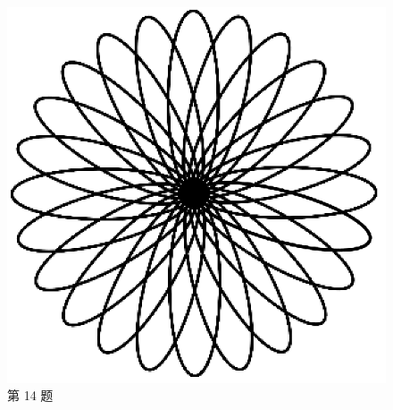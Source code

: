\documentclass[10pt, a4paper]{article}
\begin{document}
\begin{enumerate}
\begin{figure}[htbp]
\begin{minipage}[t]{.33\textwidth}
                \begin{minipage}[t]{.58\textwidth}
                    \centering
                    \includegraphics[width=\textwidth]{14-2.png}
                \end{minipage}
                \caption*{第 14 题}
            \end{minipage}
            \begin{minipage}[t]{.13\textwidth}
                \centering

\end{minipage}
\end{figure}
\end{enumerate}
\end{document}
